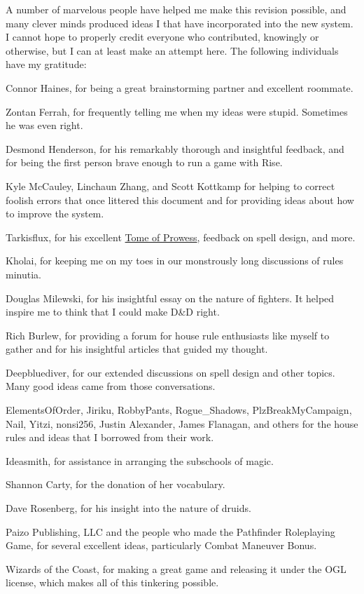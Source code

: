 A number of marvelous people have helped me make this revision possible, and many clever minds produced ideas I that have incorporated into the new system. I cannot hope to properly credit everyone who contributed, knowingly or otherwise, but I can at least make an attempt here. The following individuals have my gratitude:

Connor Haines, for being a great brainstorming partner and excellent roommate.

Zontan Ferrah, for frequently telling me when my ideas were stupid. Sometimes he was even right.

Desmond Henderson, for his remarkably thorough and insightful feedback, and for being the first person brave enough to run a game with Rise.

Kyle McCauley, Linchaun Zhang, and Scott Kottkamp for helping to correct foolish errors that once littered this document and for providing ideas about how to improve the system.

Tarkisflux, for his excellent \href{http://dnd-wiki.org/wiki/Tome_of_Prowess_(3.5e_Sourcebook)}{Tome of Prowess}, feedback on spell design, and more.

Kholai, for keeping me on my toes in our monstrously long discussions of rules minutia.

Douglas Milewski, for his insightful essay on the nature of fighters. It helped inspire me to think that I could make D\&D right.

Rich Burlew, for providing a forum for house rule enthusiasts like myself to gather and for his insightful articles that guided my thought.

Deepbluediver, for our extended discussions on spell design and other topics. Many good ideas came from those conversations.

ElementsOfOrder, Jiriku, RobbyPants, Rogue\_Shadows, PlzBreakMyCampaign, Nail, Yitzi, nonsi256, Justin Alexander, James Flanagan, and others for the house rules and ideas that I borrowed from their work.

Ideasmith, for assistance in arranging the subschools of magic.

Shannon Carty, for the donation of her vocabulary.

Dave Rosenberg, for his insight into the nature of druids.

Paizo Publishing, LLC and the people who made the Pathfinder Roleplaying Game, for several excellent ideas, particularly Combat Maneuver Bonus.

Wizards of the Coast, for making a great game and releasing it under the OGL license, which makes all of this tinkering possible.
